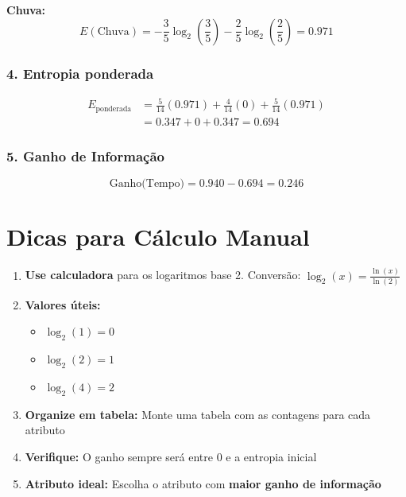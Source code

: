 \documentclass[12pt,a4paper]{article}
\begin{document}
\textbf{Chuva:}
\begin{equation}
E(\text{Chuva}) = -\frac{3}{5}\log_2\left(\frac{3}{5}\right) - \frac{2}{5}\log_2\left(\frac{2}{5}\right) = 0.971
\end{equation}

\subsubsection{4. Entropia ponderada}

\begin{align}
E_{\text{ponderada}} &= \frac{5}{14}(0.971) + \frac{4}{14}(0) + \frac{5}{14}(0.971) \\
&= 0.347 + 0 + 0.347 = 0.694
\end{align}

\subsubsection{5. Ganho de Informação}

\begin{equation}
\text{Ganho(Tempo)} = 0.940 - 0.694 = 0.246
\end{equation}

\section{Dicas para Cálculo Manual}

\begin{enumerate}
    \item \textbf{Use calculadora} para os logaritmos base 2. Conversão: $\log_2(x) = \frac{\ln(x)}{\ln(2)}$
    
    \item \textbf{Valores úteis:}
    \begin{itemize}
        \item $\log_2(1) = 0$
        \item $\log_2(2) = 1$
        \item $\log_2(4) = 2$
    \end{itemize}
    
    \item \textbf{Organize em tabela:} Monte uma tabela com as contagens para cada atributo
    
    \item \textbf{Verifique:} O ganho sempre será entre 0 e a entropia inicial
    
    \item \textbf{Atributo ideal:} Escolha o atributo com \textbf{maior ganho de informação}
\end{enumerate}
\end{document}
